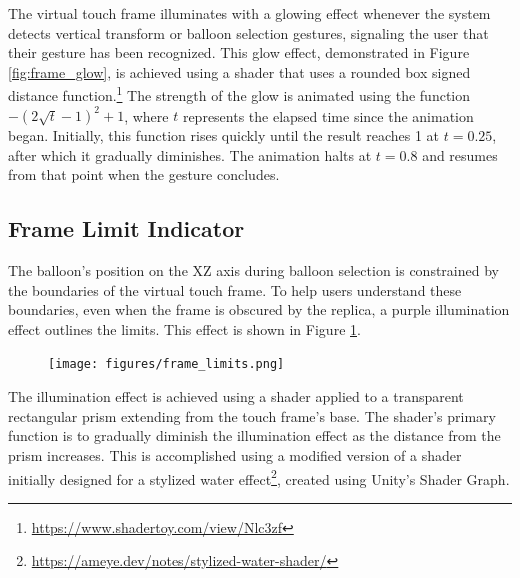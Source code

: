         The virtual touch frame illuminates with a glowing effect whenever the system detects vertical transform or balloon selection gestures, signaling the user that their gesture has been recognized. This glow effect, demonstrated in Figure \ref{fig:frame_glow}, is achieved using a shader that uses a rounded box signed distance function.\footnote{\url{https://www.shadertoy.com/view/Nlc3zf}} The strength of the glow is animated using the function $-\left(2 \sqrt{t} - 1\right)^2 + 1$, where \(t\) represents the elapsed time since the animation began. Initially, this function rises quickly until the result reaches 1 at $t = 0.25$, after which it gradually diminishes. The animation halts at \(t = 0.8\) and resumes from that point when the gesture concludes.
                    


    
    
    \subsection{Frame Limit Indicator} \label{sec:frame_limits}

        The balloon's position on the XZ axis during balloon selection is constrained by the boundaries of the virtual touch frame. To help users understand these boundaries, even when the frame is obscured by the replica, a purple illumination effect outlines the limits. This effect is shown in Figure \ref{fig:frame_limits}.

        \begin{figure}[h!]
            \centering
            \texttt{[image: figures/frame\_limits.png]}
            \label{fig:frame_limits}
        \end{figure}
    
        The illumination effect is achieved using a shader applied to a transparent rectangular prism extending from the touch frame's base. The shader's primary function is to gradually diminish the illumination effect as the distance from the prism increases. This is accomplished using a modified version of a shader initially designed for a stylized water effect\footnote{\url{https://ameye.dev/notes/stylized-water-shader/}}, created using Unity's Shader Graph.
        
